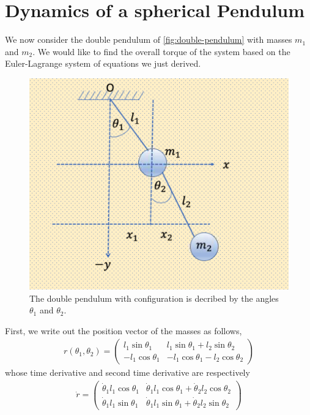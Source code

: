 \section{Dynamics of a spherical Pendulum}
%
We now consider the double pendulum of \autoref{fig:double-pendulum} with masses $m_1$ and $m_2$. We would like to find the overall torque of the system based on the Euler-Lagrange system of equations we just derived.
%
\begin{figure}[tb!]
	\centering
	\includegraphics[width=.8\columnwidth]{figures/double-pendulum.png}
	\caption{The double pendulum with configuration is decribed by the angles $\theta_1$ and $\theta_2$.}
	\label{fig:double-pendulum}
\end{figure}
%
First, we write out the position vector of the masses as follows,
%
\begin{align}
	r(\theta_1, \theta_2) = \left(\begin{array}{c|c}
	l_1 \sin \theta_1 & l_1 \sin \theta_1  + l_2 \sin \theta_2
	\\
	-l_1 \cos \theta_1 & -l_1 \cos \theta_1  - l_2 \cos \theta_2
	\end{array}\right)
\end{align}
%
whose time derivative and second time derivative are respectively
%
\begin{align}
	\dot{r} = \left(\begin{array}{c|c}
	\dot{\theta}_1 l_1 \cos \theta_1 & \dot{\theta}_1 l_1 \cos \theta_1  + \dot{\theta}_2 l_2 \cos \theta_2
	\\
	\dot{\theta}_1 l_1 \sin \theta_1 & \dot{\theta}_1 l_1 \sin \theta_1  + \dot{\theta}_2 l_2 \sin \theta_2
	\end{array}\right)
\end{align}
